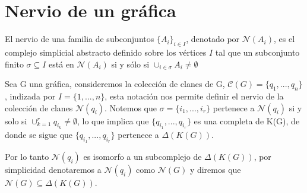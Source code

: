 \section{Nervio de un gráfica}
\begin{Defi} 
El nervio de una familia de subconjuntos ${\{A_i\}}_{i\in I}$, denotado por $\mathcal{N}(A_i)$, es el complejo simplicial abstracto definido sobre los vértices $I$ tal que un subconjunto finito $\sigma \subseteq I$ está en $\mathcal{N}(A_i)$ si y sólo si ${\cup}_{i\in \sigma}A_i \neq \emptyset$
\end{Defi}
\begin{Ejem}
Sea G una gráfica, consideremos la colección de clanes de G, $\mathcal{C}(G) = \{q_1,...,q_n\}$, indizada por $I =\{1,...,n\}$, esta notación nos permite definir el nervio de la colección de clanes $\mathcal{N}(q_i)$. Notemos que $\sigma = \{i_1,...,i_r\}$ pertenece a $\mathcal{N}(q_i)$ si y solo si $\cup_{k=1}^{r}q_{i_k}\neq\emptyset$, lo que implica que $\{q_{i_1},...,q_{i_r}\}$ es una completa de K(G), de donde se sigue que $\{q_{i_1},...,q_{i_r}\}$ pertenece a $\Delta(K(G))$.

Por lo tanto $\mathcal{N}(q_i)$ es isomorfo a un subcomplejo de $\Delta(K(G))$, por simplicidad denotaremos a $\mathcal{N}(q_i)$ como $\mathcal{N}(G)$ y diremos que $\mathcal{N}(G)\subseteq \Delta(K(G))$.
\end{Ejem}


